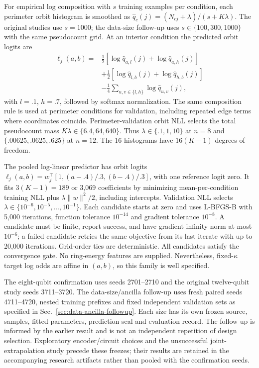 For empirical log composition with $s$ training examples per condition, each perimeter orbit histogram is smoothed as $\widehat q_c(j)=(N_{cj}+\lambda)/(s+K\lambda)$. The original studies use $s=1000$; the data-size follow-up uses $s\in\{100,300,1000\}$ with the same pseudocount grid. At an interior condition the predicted orbit logits are
\begin{equation}
\begin{split}
 \ell_j(a,b)={}&\tfrac12\left[\log\widehat q_{a,l}(j)+\log\widehat q_{a,h}(j)\right]\\
 &+\tfrac12\left[\log\widehat q_{l,b}(j)+\log\widehat q_{h,b}(j)\right]\\
 &-\tfrac14\sum_{u,v\in\{l,h\}}\log\widehat q_{u,v}(j),
\end{split}
\end{equation}
with $l=.1$, $h=.7$, followed by softmax normalization. The same composition rule is used at perimeter conditions for validation, including repeated edge terms where coordinates coincide. Perimeter-validation orbit NLL selects the total pseudocount mass $K\lambda\in\{6.4,64,640\}$. Thus $\lambda\in\{.1,1,10\}$ at $n=8$ and $\{.00625,.0625,.625\}$ at $n=12$. The 16 histograms have $16(K-1)$ degrees of freedom.

The pooled log-linear predictor has orbit logits $\ell_j(a,b)=w_j^\top[1,(a-.4)/.3,(b-.4)/.3]$, with one reference logit zero. It fits $3(K-1)=189$ or 3,069 coefficients by minimizing mean-per-condition training NLL plus $\lambda\|w\|^2/2$, including intercepts. Validation NLL selects $\lambda\in\{10^{-6},10^{-5},\ldots,10^{-1}\}$. Each candidate starts at zero and uses L-BFGS-B with 5,000 iterations, function tolerance $10^{-14}$ and gradient tolerance $10^{-8}$. A candidate must be finite, report success, and have gradient infinity norm at most $10^{-6}$; a failed candidate retries the same objective from its last iterate with up to 20,000 iterations. Grid-order ties are deterministic. All candidates satisfy the convergence gate. No ring-energy features are supplied. Nevertheless, fixed-$\kappa$ target log odds are affine in $(a,b)$, so this family is well specified.

The eight-qubit confirmation uses seeds 2701--2710 and the original twelve-qubit study seeds 3711--3720. The data-size/ancilla follow-up uses fresh paired seeds 4711--4720, nested training prefixes and fixed independent validation sets as specified in Sec.~\ref{sec:data-ancilla-followup}. Each size has its own frozen source, samples, fitted parameters, prediction seal and evaluation record. The follow-up is informed by the earlier result and is not an independent repetition of design selection. Exploratory encoder/circuit choices and the unsuccessful joint-extrapolation study precede these freezes; their results are retained in the accompanying research artifacts rather than pooled with the confirmation seeds.

